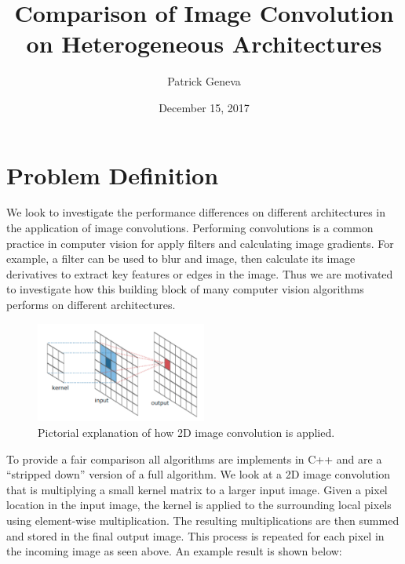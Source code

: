 \documentclass{article}
\title{Comparison of Image Convolution on Heterogeneous Architectures}
\author{Patrick Geneva}
\date{December 15, 2017}
\begin{document}
\setlength{\droptitle}{-2cm}
\maketitle

\section{Problem Definition}

We look to investigate the performance differences on different architectures in the application of image convolutions.
Performing convolutions is a common practice in computer vision for apply filters and calculating image gradients.
For example, a filter can be used to blur and image, then calculate its image derivatives to extract key features or edges in the image.
Thus we are motivated to investigate how this building block of many computer vision algorithms performs on different architectures.

\begin{figure}[h]
\centering
\includegraphics[width=0.5\textwidth]{fig_gen/conv.png}
\caption{Pictorial explanation of how 2D image convolution is applied.}
\end{figure}


To provide a fair comparison all algorithms are implements in C++ and are a ``stripped down'' version of a full algorithm.
We look at a 2D image convolution that is multiplying a small kernel matrix to a larger input image.
Given a pixel location in the input image, the kernel is applied to the surrounding local pixels using element-wise multiplication.
The resulting multiplications are then summed and stored in the final output image.
This process is repeated for each pixel in the incoming image as seen above.
An example result is shown below:
\end{document}
